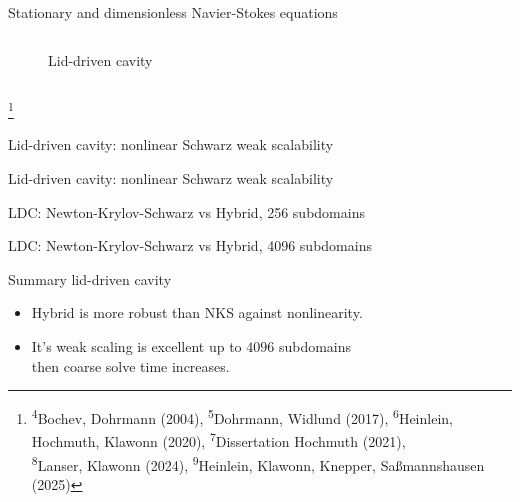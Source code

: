 \begin{frame}{Stationary and dimensionless Navier-Stokes equations}
\begin{columns}
\begin{column}{0.4\textwidth}
\begin{figure}
				\caption{Lid-driven cavity}
			\end{figure}
		\end{column}
	\end{columns}
    {\let\thefootnote\relax\footnote{{\tiny \!\!\!\!\textsuperscript{4}Bochev, Dohrmann (2004),  \textsuperscript{5}Dohrmann, Widlund (2017), \textsuperscript{6}Heinlein, Hochmuth, Klawonn (2020),  \textsuperscript{7}Dissertation Hochmuth (2021),\\\hspace{3em}\!\!\!\!\!\!\textsuperscript{8}Lanser, Klawonn (2024),  \textsuperscript{9}Heinlein, Klawonn, Knepper, Saßmannshausen (2025)}}}
\end{frame}

\begin{frame}{Lid-driven cavity: nonlinear Schwarz weak scalability}
	\begin{figure}
		\centering
		
		\label{fig:weak-scalability-nls}
	\end{figure}
\end{frame}

\begin{frame}{Lid-driven cavity: nonlinear Schwarz weak scalability}
	\begin{figure}
		\centering
		
		\label{fig:weak-scalability-per-iter-nls}
	\end{figure}
\end{frame}

\begin{frame}{LDC: Newton-Krylov-Schwarz vs Hybrid, 256 subdomains}
	\begin{figure}
		\centering
		
		\label{fig:residual-ldc-256}
	\end{figure}
\end{frame}

\begin{frame}{LDC: Newton-Krylov-Schwarz vs Hybrid, 4096 subdomains}
	\begin{figure}
		\centering
		
		\label{fig:residual-ldc-4096}
	\end{figure}
\end{frame}

\begin{frame}{Summary lid-driven cavity}
	\begin{itemize}
		\item Hybrid is more robust than NKS against nonlinearity.
		\item It's weak scaling is excellent up to $4096$ subdomains\\then coarse solve time increases. %
	\end{itemize}
\end{frame}

